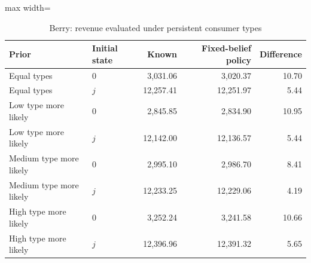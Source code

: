 \begin{table}[htbp]\centering\small
\caption{Berry: revenue evaluated under persistent consumer types}
\label{tab:empirical-information-berry}
\begin{adjustbox}{max width=\linewidth}
\begin{tabular}{llrrr}\toprule
Prior & Initial state & Known & Fixed-belief policy & Difference\\\midrule
Equal types & $0$ & 3,031.06 & 3,020.37 & 10.70 \\
Equal types & $j$ & 12,257.41 & 12,251.97 & 5.44 \\
Low type more likely & $0$ & 2,845.85 & 2,834.90 & 10.95 \\
Low type more likely & $j$ & 12,142.00 & 12,136.57 & 5.44 \\
Medium type more likely & $0$ & 2,995.10 & 2,986.70 & 8.41 \\
Medium type more likely & $j$ & 12,233.25 & 12,229.06 & 4.19 \\
High type more likely & $0$ & 3,252.24 & 3,241.58 & 10.66 \\
High type more likely & $j$ & 12,396.96 & 12,391.32 & 5.65 \\
\bottomrule\end{tabular}
\end{adjustbox}
\end{table}
